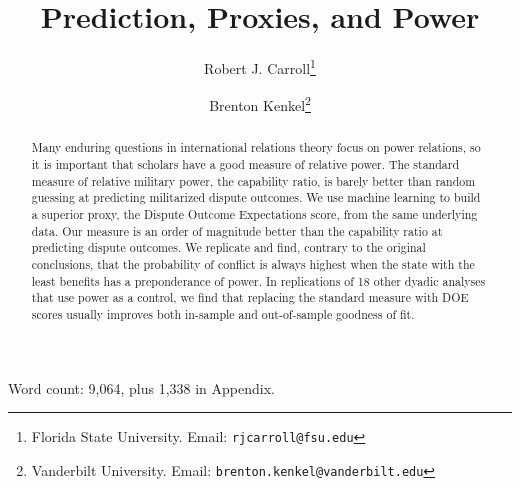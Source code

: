\documentclass[12pt,oneside]{article}
\title{
  Prediction, Proxies, and Power%
}
\author{
	Robert J. Carroll\thanks{Florida State University.  Email:  \nolinkurl{rjcarroll@fsu.edu}} \and Brenton Kenkel\thanks{Vanderbilt University.  Email:  \nolinkurl{brenton.kenkel@vanderbilt.edu}}
}
\begin{document}
\maketitle

\begin{abstract}
  \noindent
  Many enduring questions in international relations theory focus on power relations, so it is important that scholars have a good measure of relative power.
  The standard measure of relative military power, the capability ratio, is barely better than random guessing at predicting militarized dispute outcomes.
  We use machine learning to build a superior proxy, the Dispute Outcome Expectations score, from the same underlying data.
  Our measure is an order of magnitude better than the capability ratio at predicting dispute outcomes.
  We replicate \citet{reed2008war} and find, contrary to the original conclusions, that the probability of conflict is always highest when the state with the least benefits has a preponderance of power.
  In replications of 18 other dyadic analyses that use power as a control, we find that replacing the standard measure with DOE scores usually improves both in-sample and out-of-sample goodness of fit.
\end{abstract}

Word count:  9,064, plus 1,338 in Appendix.

\thispagestyle{empty}
\newpage
\setcounter{page}{1}

\doublespacing



















\newpage

\singlespacing





\clearpage
\appendix

\singlespacing


\end{document}
